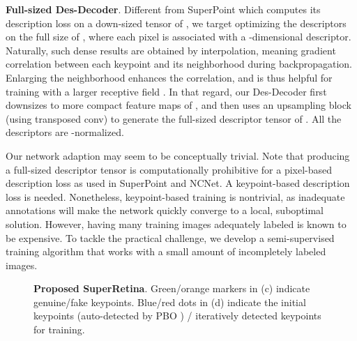 \textbf{Full-sized Des-Decoder}.
Different from SuperPoint which computes its description loss on a down-sized tensor of , we target optimizing the descriptors on the full size of , where each pixel is associated with a -dimensional descriptor. Naturally, such dense results are obtained by interpolation, meaning gradient correlation between each keypoint and its neighborhood during backpropagation. Enlarging the neighborhood enhances the correlation, and is thus helpful for training with a larger receptive field \cite{chen2017deeplab}. In that regard, our Des-Decoder first downsizes  to more compact feature maps of , and then uses an upsampling block (using transposed conv) to generate the full-sized descriptor tensor  of . All the descriptors are -normalized.

Our network adaption may seem to be conceptually trivial. Note that producing a full-sized descriptor tensor is computationally prohibitive for a pixel-based description loss as used in SuperPoint and NCNet. A keypoint-based description loss is needed. Nonetheless, keypoint-based training is nontrivial, as inadequate annotations will make the network quickly converge to a local, suboptimal solution. However, having many training images adequately labeled is known to be expensive. To tackle the practical challenge, we develop a semi-supervised training algorithm that works with a small amount of incompletely labeled images.


\newlength{\twosubht}
\newsavebox{\twosubbox}

\begin{figure}[htb!]
\sbox{}
\setlength{\twosubht}{\ht\twosubbox}



\centering

 \quad
{}

\sbox{}
\setlength{\twosubht}{\ht\twosubbox}

\centering

\quad
{}
\caption{\textbf{Proposed SuperRetina}. Green/orange markers in (c) indicate genuine/fake keypoints. Blue/red dots in (d) indicate the initial keypoints (auto-detected by PBO \cite{oinonen2010identity}) / iteratively detected keypoints for training.}

\label{fig:training-detector}

\end{figure}
 
